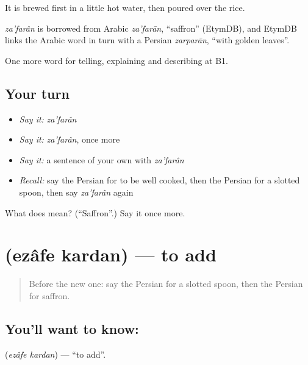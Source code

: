 It is brewed first in a little hot water, then poured over the rice.

\begin{cousinweb}
\emph{za'farân} is borrowed from Arabic \emph{za'farān}, \textquotedblleft{}saffron\textquotedblright{} (EtymDB), and EtymDB links the Arabic word in turn with a Persian \emph{zarparān}, \textquotedblleft{}with golden leaves\textquotedblright{}.
\end{cousinweb}

\begin{grammarlens}[title={What you've built}]
One more word for telling, explaining and describing at B1.
\end{grammarlens}

\subsection*{Your turn}
\begin{itemize}
\raggedright
  \item \emph{Say it:} \emph{za'farân}
  \item \emph{Say it:} \emph{za'farân}, once more
  \item \emph{Say it:} a sentence of your own with \emph{za'farân}
  \item \emph{Recall:} say the Persian for to be well cooked, then the Persian for a slotted spoon, then say \emph{za'farân} again
\end{itemize}

\begin{tcolorbox}[breakable,colback=teal!4,colframe=teal!35!black,title={Before you move on}]
What does  mean? (\textquotedblleft{}Saffron\textquotedblright{}.) Say it once more.
\end{tcolorbox}
\section[\texorpdfstring{\fa{اضافه} \fa{کردن} (ezâfe kardan)}{اضافه کردن (ezâfe kardan)}]{  (ezâfe kardan) — to add}

\label{lesson:FA-C359-ezafe-kardan}



\begin{quote}
Before the new one: say the Persian for a slotted spoon, then the Persian for saffron.
\end{quote}

\subsection*{You'll want to know:  }
\textbf{ } (\emph{ezâfe kardan}) — \textquotedblleft{}to add\textquotedblright{}.

